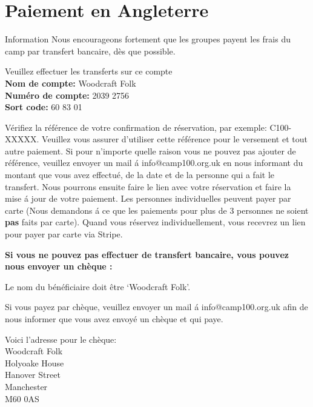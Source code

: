 \documentclass[a4paper, 11pt]{report}
\begin{document}
\makedocumenttitlepage

\tableofcontents

\chapter{Paiement en Angleterre}

\begin{callout-green}{Information}
Nous encourageons fortement que les groupes payent les frais du camp par transfert bancaire, d\`es que possible.
\end{callout-green}

Veuillez effectuer les transferts sur ce compte\\
\textbf{Nom de compte:} Woodcraft Folk\\
\textbf{Num\'ero de compte:} 2039 2756\\
\textbf{Sort code:} 60 83 01

V\'erifiez la r\'ef\'erence de votre confirmation de r\'eservation, par exemple: C100-XXXXX. Veuillez vous assurer d'utiliser cette r\'ef\'erence pour le versement et tout autre paiement.
Si pour n'importe quelle raison vous ne pouvez pas ajouter de r\'ef\'erence, veuillez envoyer un mail \'a info@camp100.org.uk en nous informant du montant que vous avez effectu\'e, de la date et de la personne qui a fait le transfert. Nous pourrons ensuite faire le lien avec votre r\'eservation et faire la mise \'a jour de votre paiement.
Les personnes individuelles peuvent payer par carte (Nous demandons \'a ce que les paiements pour plus de 3 personnes ne soient \textbf{pas} faits par carte). Quand vous r\'eservez individuellement, vous recevrez un lien pour payer par carte via Stripe.

\textbf{Si vous ne pouvez pas effectuer de transfert bancaire, vous pouvez nous envoyer un ch\`eque :}

Le nom du b\'en\'eficiaire doit \^etre `Woodcraft Folk'.

Si vous payez par ch\`eque, veuillez envoyer un mail \'a info@camp100.org.uk afin de nous informer que vous avez envoy\'e un ch\`eque et qui paye.  

Voici l'adresse pour le ch\`eque:\\
Woodcraft Folk\\
Holyoake House\\
Hanover Street\\
Manchester \\
M60 0AS\\
\end{document}
